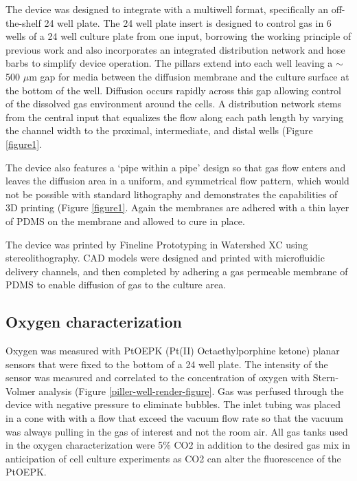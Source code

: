 The device was designed to integrate with a multiwell format, specifically an off-the-shelf 24 well plate. 
The 24 well plate insert is designed to control gas in 6 wells of a 24 well culture plate from one input, borrowing the working principle of previous work\cite{oppegard2010} and also incorporates an integrated distribution network and hose barbs to simplify device operation.
The pillars extend into each well leaving a $\sim$500 $\mu$m gap for media between the diffusion membrane and the culture surface at the bottom of the well.
Diffusion occurs rapidly across this gap allowing control of the dissolved gas environment around the cells. 
A distribution network stems from the central input that equalizes the flow along each path length by varying the channel width to the proximal, intermediate, and distal wells (Figure \ref{figure1}.

The device also features a ‘pipe within a pipe’ design so that gas flow enters and leaves the diffusion area in a uniform, and symmetrical flow pattern, which would not be possible with standard lithography and demonstrates the capabilities of 3D printing (Figure \ref{figure1}.
Again the membranes are adhered with a thin layer of PDMS on the membrane and allowed to cure in place.

The device was printed by Fineline Prototyping in Watershed XC using stereolithography.
CAD models were designed and printed with microfluidic delivery channels, and then completed by 
adhering a gas permeable membrane of PDMS to enable diffusion of gas to the culture area. 

\subsection*{Oxygen characterization}

Oxygen was measured with PtOEPK (Pt(II) Octaethylporphine ketone) planar sensors that were fixed to the bottom of a 24 well plate. 
The intensity of the sensor was measured and correlated to the concentration of oxygen with Stern-Volmer analysis (Figure \ref{piller-well-render-figure}.
Gas was perfused through the device with negative pressure to eliminate bubbles.
The inlet tubing was placed in a cone with with a flow that exceed the vacuum flow rate so that the vacuum was always pulling in the gas of interest and not the room air.
All gas tanks used in the oxygen characterization were 5\% CO2 in addition to the desired gas mix in anticipation of cell culture experiments as CO2 can alter the fluorescence of the PtOEPK.

